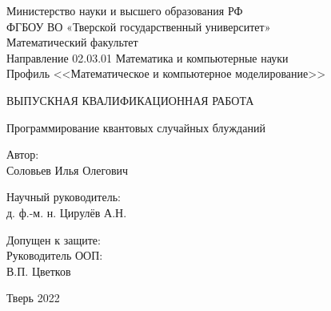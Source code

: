 \documentclass[a4paper]{report}
\begin{document}
\begin{titlepage}
	\begin{center}
		Министерство науки и высшего образования РФ\\
		ФГБОУ ВО «Тверской государственный университет»\\
		Математический факультет\\
		Направление 02.03.01 Математика и компьютерные науки\\
		Профиль <<Математическое и компьютерное моделирование>>	
	\end{center}
	
	\vspace{2.5cm}
	\begin{center}
	
		{ВЫПУСКНАЯ КВАЛИФИКАЦИОННАЯ РАБОТА }
		
		
		\vspace{1.0cm}
		\large{Программирование квантовых случайных блужданий}
		
		
		\vspace{1.5cm}
	\end{center}
	
	
	
	\begin{flushright}
		\begin{minipage}{80mm}
			Автор:\\
			Соловьев Илья Олегович
			
			\vspace{1.0cm}
			Научный руководитель:\\
			д. ф.-м. н. Цирулёв А.Н.
			
		\end{minipage}
	\end{flushright}
	
	
	\vspace{1.6cm}
	\noindent Допущен к защите:\\
	Руководитель ООП:\\[1cm]
	\underline{\qquad \qquad \qquad \qquad \qquad }
    В.П. Цветков \\
	\vspace{2.3cm}
	
	
	
	\begin{center}
		Тверь 2022
	\end{center}
	
	\date{}
\end{titlepage}

\setcounter{page}{2}

\tableofcontents
\newpage
\end{document}
